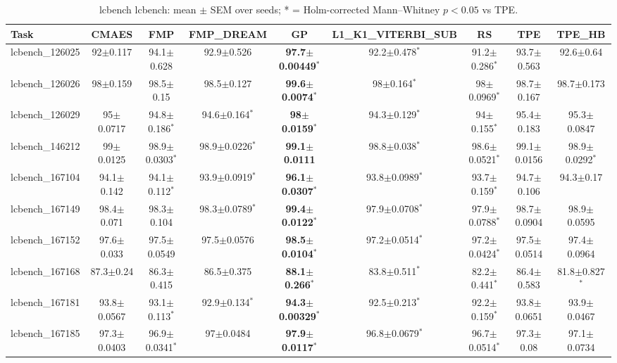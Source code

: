 \begin{table}[t]
\caption{lcbench lcbench: mean $\pm$ SEM over seeds; * = Holm-corrected Mann--Whitney $p<0.05$ vs TPE.}
\label{tab:lcbench_lcbench}
\begin{center}\small
\begin{tabular}{lcccccccc}
\hline
Task & CMAES & FMP & FMP\_DREAM & GP & L1\_K1\_VITERBI\_SUB & RS & TPE & TPE\_HB \\
\hline
lcbench\_126025 & 92$\pm$0.117 & 94.1$\pm$0.628 & 92.9$\pm$0.526 & \textbf{97.7$\pm$0.00449}$^{*}$ & 92.2$\pm$0.478$^{*}$ & 91.2$\pm$0.286$^{*}$ & 93.7$\pm$0.563 & 92.6$\pm$0.64 \\
lcbench\_126026 & 98$\pm$0.159 & 98.5$\pm$0.15 & 98.5$\pm$0.127 & \textbf{99.6$\pm$0.0074}$^{*}$ & 98$\pm$0.164$^{*}$ & 98$\pm$0.0969$^{*}$ & 98.7$\pm$0.167 & 98.7$\pm$0.173 \\
lcbench\_126029 & 95$\pm$0.0717 & 94.8$\pm$0.186$^{*}$ & 94.6$\pm$0.164$^{*}$ & \textbf{98$\pm$0.0159}$^{*}$ & 94.3$\pm$0.129$^{*}$ & 94$\pm$0.155$^{*}$ & 95.4$\pm$0.183 & 95.3$\pm$0.0847 \\
lcbench\_146212 & 99$\pm$0.0125 & 98.9$\pm$0.0303$^{*}$ & 98.9$\pm$0.0226$^{*}$ & \textbf{99.1$\pm$0.0111} & 98.8$\pm$0.038$^{*}$ & 98.6$\pm$0.0521$^{*}$ & 99.1$\pm$0.0156 & 98.9$\pm$0.0292$^{*}$ \\
lcbench\_167104 & 94.1$\pm$0.142 & 94.1$\pm$0.112$^{*}$ & 93.9$\pm$0.0919$^{*}$ & \textbf{96.1$\pm$0.0307}$^{*}$ & 93.8$\pm$0.0989$^{*}$ & 93.7$\pm$0.159$^{*}$ & 94.7$\pm$0.106 & 94.3$\pm$0.17 \\
lcbench\_167149 & 98.4$\pm$0.071 & 98.3$\pm$0.104 & 98.3$\pm$0.0789$^{*}$ & \textbf{99.4$\pm$0.0122}$^{*}$ & 97.9$\pm$0.0708$^{*}$ & 97.9$\pm$0.0788$^{*}$ & 98.7$\pm$0.0904 & 98.9$\pm$0.0595 \\
lcbench\_167152 & 97.6$\pm$0.033 & 97.5$\pm$0.0549 & 97.5$\pm$0.0576 & \textbf{98.5$\pm$0.0104}$^{*}$ & 97.2$\pm$0.0514$^{*}$ & 97.2$\pm$0.0424$^{*}$ & 97.5$\pm$0.0514 & 97.4$\pm$0.0964 \\
lcbench\_167168 & 87.3$\pm$0.24 & 86.3$\pm$0.415 & 86.5$\pm$0.375 & \textbf{88.1$\pm$0.266}$^{*}$ & 83.8$\pm$0.511$^{*}$ & 82.2$\pm$0.441$^{*}$ & 86.4$\pm$0.583 & 81.8$\pm$0.827$^{*}$ \\
lcbench\_167181 & 93.8$\pm$0.0567 & 93.1$\pm$0.113$^{*}$ & 92.9$\pm$0.134$^{*}$ & \textbf{94.3$\pm$0.00329}$^{*}$ & 92.5$\pm$0.213$^{*}$ & 92.2$\pm$0.159$^{*}$ & 93.8$\pm$0.0651 & 93.9$\pm$0.0467 \\
lcbench\_167185 & 97.3$\pm$0.0403 & 96.9$\pm$0.0341$^{*}$ & 97$\pm$0.0484 & \textbf{97.9$\pm$0.0117}$^{*}$ & 96.8$\pm$0.0679$^{*}$ & 96.7$\pm$0.0514$^{*}$ & 97.3$\pm$0.08 & 97.1$\pm$0.0734 \\

\end{tabular}
\end{center}
\end{table}
